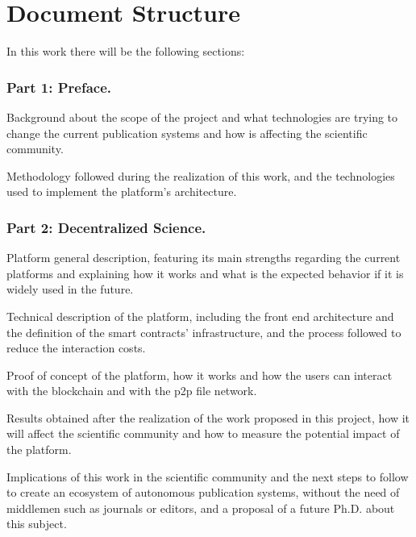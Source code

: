   \section{Document Structure}
  In this work there will be the following sections:

  \subsubsection*{Part 1: Preface.}
  \begin{itemize}
     Background about the scope of the
    project and what technologies are trying to change the current publication
    systems and how is affecting the scientific community.

    Methodology followed during the
    realization of this work, and the technologies used to implement the
    platform's architecture.
  \end{itemize}
  \subsubsection*{Part 2: Decentralized Science.}
  \begin{itemize}
     Platform general description, featuring its
    main strengths regarding the current platforms and explaining how it works
    and what is the expected behavior if it is widely used in the future.

     Technical description of the platform, including the
    front end architecture and the definition of the smart contracts'
    infrastructure, and the process followed to reduce the interaction costs.

     Proof of concept of the platform, how it works and how the
    users can interact with the blockchain and with the p2p file network.

     Results obtained after the realization of the work
    proposed in this project, how it will affect the scientific community and
    how to measure the potential impact of the platform.

     Implications of this work in the
    scientific community and the next steps to follow to create an ecosystem of
    autonomous publication systems, without the need of middlemen such as
    journals or editors, and a proposal of a future Ph.D. about this subject.
  \end{itemize}


